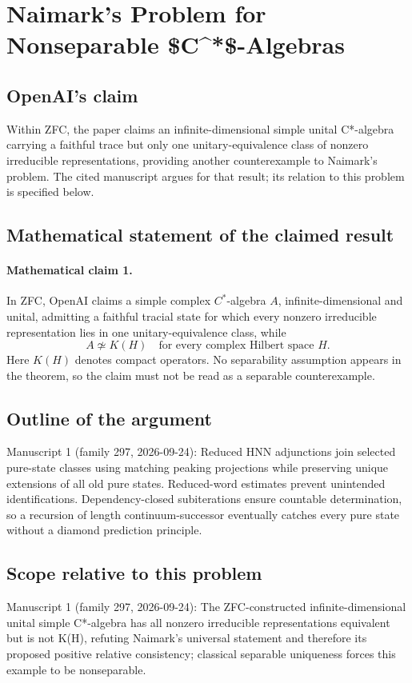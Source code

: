 \documentclass[11pt]{article}
\begin{document}
\section*{Naimark's Problem for Nonseparable \$C\textasciicircum{}*\$-Algebras}

\subsection{OpenAI's claim}
Within ZFC, the paper claims an infinite-dimensional simple unital C*-algebra carrying a faithful trace but only one unitary-equivalence class of nonzero irreducible representations, providing another counterexample to Naimark's problem. The cited manuscript argues for that result; its relation to this problem is specified below.

\subsection{Mathematical statement of the claimed result}
\paragraph{Mathematical claim 1.} In ZFC, OpenAI claims a simple complex $C^*$-algebra $A$, infinite-dimensional and unital, admitting a faithful tracial state for which every nonzero irreducible representation lies in one unitary-equivalence class, while
\[
A\not\simeq K(H)\quad\text{for every complex Hilbert space }H.
\]
Here $K(H)$ denotes compact operators. No separability assumption appears in the theorem, so the claim must not be read as a separable counterexample.

\subsection{Outline of the argument}
Manuscript 1 (family 297, 2026-09-24): Reduced HNN adjunctions join selected pure-state classes using matching peaking projections while preserving unique extensions of all old pure states. Reduced-word estimates prevent unintended identifications. Dependency-closed subiterations ensure countable determination, so a recursion of length continuum-successor eventually catches every pure state without a diamond prediction principle.

\subsection{Scope relative to this problem}
Manuscript 1 (family 297, 2026-09-24): The ZFC-constructed infinite-dimensional unital simple C*-algebra has all nonzero irreducible representations equivalent but is not K(H), refuting Naimark’s universal statement and therefore its proposed positive relative consistency; classical separable uniqueness forces this example to be nonseparable.
\end{document}
